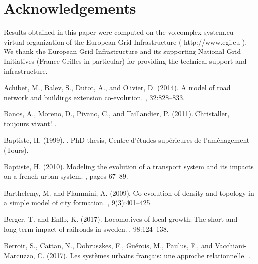 \documentclass[11pt]{article}
\begin{document}
\section*{Acknowledgements}

Results obtained in this paper were computed on the vo.complex-system.eu virtual organization of the European Grid Infrastructure ( http://www.egi.eu ). We thank the European Grid Infrastructure and its supporting National Grid Initiatives (France-Grilles in particular) for providing the technical support and infrastructure.



\begin{thebibliography}{}

Achibet, M., Balev, S., Dutot, A., and Olivier, D. (2014).
\newblock A model of road network and buildings extension co-evolution.
, 32:828--833.

Banos, A., Moreno, D., Pivano, C., and Taillandier, P. (2011).
\newblock Christaller, toujours vivant!
.

Baptiste, H. (1999).
.
\newblock PhD thesis, Centre d'{\'e}tudes sup{\'e}rieures de l'am{\'e}nagement
  (Tours).

Baptiste, H. (2010).
\newblock Modeling the evolution of a transport system and its impacts on a
  french urban system.
, pages
  67--89.

Barthelemy, M. and Flammini, A. (2009).
\newblock Co-evolution of density and topology in a simple model of city
  formation.
, 9(3):401--425.

Berger, T. and Enflo, K. (2017).
\newblock Locomotives of local growth: The short-and long-term impact of
  railroads in sweden.
, 98:124--138.

Berroir, S., Cattan, N., Dobruszkes, F., Gu{\'e}rois, M., Paulus, F., and
  Vacchiani-Marcuzzo, C. (2017).
\newblock Les syst{\`e}mes urbains fran{\c{c}}ais: une approche relationnelle.
.


\end{thebibliography}
\end{document}
